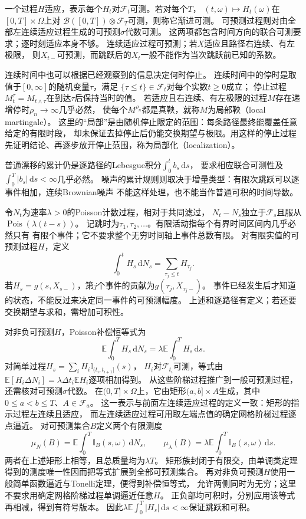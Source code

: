 一个过程$H$适应，表示每个$H_t$对$\mathcal F_t$可测。若对每个$T$，
$(t,\omega)\mapsto H_t(\omega)$在$[0,T]\times\Omega$上对
$\mathcal B([0,T])\otimes\mathcal F_T$可测，则称它渐进可测。
可预测过程则对由全部左连续适应过程生成的可预测$\sigma$代数可测。
这两项都包含时间方向的联合可测要求；逐时刻适应本身不够。
连续适应过程可预测；若$X$适应且路径右连续、有左极限，
则$X_{t-}$可预测，而跳跃后的$X_t$一般不能作为当次跳跃前已知的系数。

连续时间中也可以根据已经观察到的信息决定何时停止。
连续时间中的停时是取值于$[0,\infty]$的随机变量$\tau$，满足
$\{\tau\leq t\}\in\mathcal F_t$对每个实数$t\geq0$成立；
停止过程$M^\tau_t=M_{t\wedge\tau}$在到达$\tau$后保持当时的值。
若适应且右连续、有左极限的过程$M$存在递增停时$\rho_n\to\infty$几乎必然，
使每个$M^{\rho_n}$都是真鞅，就称$M$为局部鞅（local martingale）。
这里的“局部”是由随机停止限定的范围：每条路径最终能覆盖任意给定的有限时段，
却未保证去掉停止后仍能交换期望与极限。用这样的停止过程先证明结论、再逐步放开停止范围，称为局部化（localization）。

普通漂移的累计仍是逐路径的Lebesgue积分$\int_0^t b_s\,\mathrm ds$，
要求相应联合可测性及$\int_0^T|b_s|\,\mathrm ds<\infty$几乎必然。
噪声的累计规则则取决于增量类型：有限次跳跃可以逐事件相加，连续Brownian噪声
不能这样处理，也不能当作普通可积的时间导数。

令$N_t$为速率$\lambda>0$的Poisson计数过程，相对于共同滤过，
$N_t-N_s$独立于$\mathcal F_s$且服从$\operatorname{Pois}(\lambda(t-s))$。
记跳时为$\tau_1,\tau_2,\ldots$。有限活动指每个有界时间区间内几乎必然只有
有限个事件；它不要求整个无穷时间轴上事件总数有限。
对有限实值的可预测过程$H$，定义
\begin{equation}
  \int_0^t H_s\,\mathrm dN_s
    =\sum_{\tau_j\leq t}H_{\tau_j}.
  \label{eq:action-state-poisson-integral}
\end{equation}
若$H_s=g(s,X_{s-})$，第$j$个事件的贡献为$g(\tau_j,X_{\tau_j-})$。
事件已经发生后才知道的状态，不能反过来决定同一事件的可预测幅度。
上述和逐路径有定义；若还要交换期望与求和，需增加可积性。

对非负可预测$H$，Poisson补偿恒等式为
\[
  \mathbb E\int_0^T H_s\,\mathrm dN_s
       =\lambda\mathbb E\int_0^T H_s\,\mathrm ds.
\]
对简单过程$H_s=\sum_iH_i\mathbb I_{(t_i,t_{i+1}]}(s)$，
$H_i$对$\mathcal F_{t_i}$可测，等式由
$\mathbb E[H_i\Delta N_i]=\lambda\Delta t_i\mathbb E H_i$逐项相加得到。
从这些阶梯过程推广到一般可预测过程，还需核对可预测$\sigma$代数。
在$(0,T]\times\Omega$上，它由矩形$(a,b]\times A$生成，其中
$0\leq a<b\leq T$、$A\in\mathcal F_a$。
这一表示与前面左连续适应过程的定义一致：矩形的指示过程左连续且适应，
而左连续适应过程可用取左端点值的确定网格阶梯过程逐点逼近。
对可预测集合$B$定义两个有限测度
\[
 \mu_N(B)=\mathbb E\int_0^T\mathbb I_B(s,\omega)\,\mathrm dN_s,
 \qquad
 \mu_\lambda(B)=\lambda\mathbb E\int_0^T\mathbb I_B(s,\omega)\,\mathrm ds.
\]
两者在上述矩形上相等，且总质量均为$\lambda T$。
矩形族封闭于有限交，由单调类定理得到的测度唯一性因而把等式扩展到全部可预测集合。
再对非负可预测$H$使用一般简单函数逼近与Tonelli定理，便得到补偿恒等式，
允许两侧同时为无穷；这里不要求用确定网格阶梯过程单调逼近任意$H$。
正负部均可积时，分别应用该等式再相减，得到有符号版本。
因此$\lambda\mathbb E\int_0^T|H_s|\,\mathrm ds<\infty$保证跳跃和可积。

